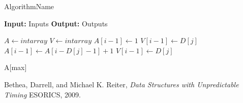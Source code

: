 \documentclass[11pt]{article}
\begin{document}


\begin{algorithm}
\caption{AlgorithmName}
\textbf{Input:} Inputs
\textbf{Output:} Outputs

\begin{algorithmic}[1]
\State $A \gets intarray$
\State $V \gets intarray$
			\State $A[i-1] \gets 1$
			\State $V[i-1] \gets D[j]$
			\State $A[i-1] \gets A[i-D[j]-1]+1$
			\State $V[i-1] \gets D[j]$
			\EndIf
		\EndIf
	\EndFor
\EndFor

\Return A[max]
\end{algorithmic}
\end{algorithm}

\pagebreak

\begin{thebibliography}{9}
	
	Bethea, Darrell, and Michael K. Reiter,
	\emph{Data Structures with Unpredictable Timing}
	ESORICS,
	2009.
	
\end{thebibliography}
\end{document}
